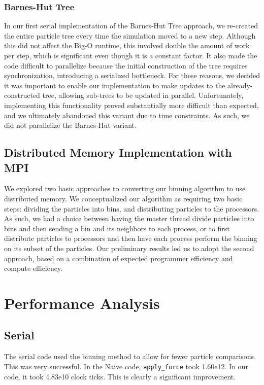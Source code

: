 \documentclass{article}
\begin{document}
\subsubsection{Barnes-Hut Tree}
In our first serial implementation of the Barnes-Hut Tree approach, we
re-created the entire particle tree every time the simulation moved to a new
step. Although this did not affect the Big-O runtime, this involved double the
amount of work per step, which is significant even though it is a constant
factor. It also made the code difficult to parallelize because the initial
construction of the tree requires synchronization, introducing a serialized
bottleneck. For these reasons, we decided it was important to enable our
implementation to make updates to the already-constructed tree, allowing
sub-trees to be updated in parallel. Unfortunately, implementing this
functionality proved substantially more difficult than expected, and we
ultimately abandoned this variant due to time constraints. As such, we did not
parallelize the Barnes-Hut variant.

\subsection{Distributed Memory Implementation with MPI}
We explored two basic approaches to converting our binning algorithm to use
distributed memory. We conceptualized our algorithm as requiring two basic
steps: dividing the particles into bins, and distributing particles to the
processors. As such, we had a choice between having the master thread divide
particles into bins and then sending a bin and its neighbors to each process, or
to first distribute particles to processors and then have each process perform
the binning on its subset of the particles. Our preliminary results led us to
adopt the second approach, based on a combination of expected programmer
efficiency and compute efficiency.


\section{Performance Analysis}\label{section:vtune}
\subsection{Serial}
The serial code used the binning method to allow for fewer particle comparisons.
This was very successful. In the Naive code, \texttt{apply\_force} took 1.60e12.
In our code, it took 4.83e10 clock ticks. This is clearly a significant
improvement.
\end{document}

